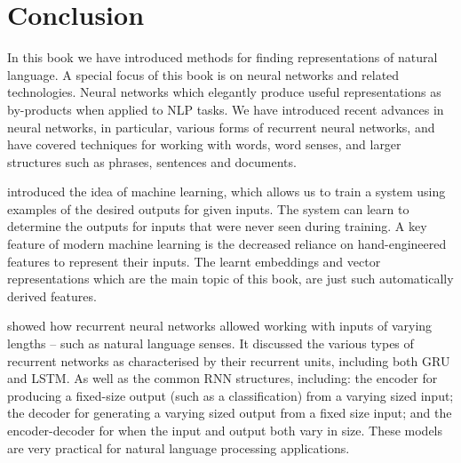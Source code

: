 \documentclass[12pt,parskip]{komatufte}
\begin{document}
\chapter{Conclusion}\label{sec:conclusion}

In this book we have introduced methods for finding representations of natural language.
A special  focus of this book is on neural networks and related technologies.
Neural networks which elegantly produce useful representations as by-products when applied to  NLP tasks.
We have introduced recent advances in neural networks, in particular, various forms of recurrent neural networks,
and have covered techniques for working with words, word senses, and larger structures such as phrases, sentences and documents.





 introduced the idea of machine learning,
which allows us to train a system using examples of the desired outputs for given inputs.
The system can learn to determine the outputs for inputs that were never seen during training.
A key feature of modern machine learning is the decreased reliance on hand-engineered features to represent their inputs.
The learnt embeddings and vector representations which are the main topic of this book, are just such automatically derived features.


 showed how recurrent neural networks allowed working with inputs of varying lengths -- such as natural language senses.
It discussed the various types of recurrent networks as characterised by their recurrent units, including both GRU and LSTM.
As well as the common RNN structures, including:
the encoder for producing a fixed-size  output (such as a classification) from a varying sized input;
the decoder for generating a varying sized output from a fixed size input;
and the encoder-decoder for when the input and output both vary in size.
These models are very practical for natural language processing applications.
\end{document}
